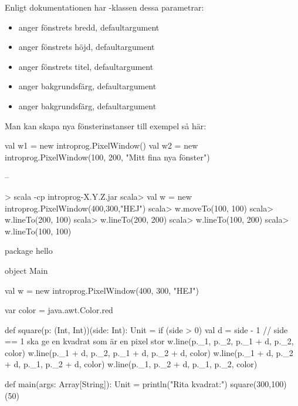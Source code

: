 \SubtaskSolved Enligt dokumentationen har -klassen dessa parametrar:
\begin{itemize}[nolistsep,noitemsep]
  \item {} anger fönstrets bredd, defaultargument 
  \item {} anger fönstrets höjd, defaultargument 
  \item {} anger fönstrets titel, defaultargument 
  \item {} anger bakgrundsfärg, defaultargument 
  \item {} anger bakgrundsfärg, defaultargument 
\end{itemize}
Man kan skapa nya fönsterinstanser till exempel så här:
\begin{Code}
val w1 = new introprog.PixelWindow()
val w2 = new introprog.PixelWindow(100, 200, "Mitt fina nya fönster")
\end{Code}

\SubtaskSolved --

\SubtaskSolved
\begin{REPL}
> scala -cp introprog-X.Y.Z.jar
scala> val w = new introprog.PixelWindow(400,300,"HEJ")
scala> w.moveTo(100, 100)
scala> w.lineTo(200, 100)
scala> w.lineTo(200, 200)
scala> w.lineTo(100, 200)
scala> w.lineTo(100, 100)
\end{REPL}

\SubtaskSolved
\begin{Code}
package hello

object Main {
  val w = new introprog.PixelWindow(400, 300, "HEJ")

  var color = java.awt.Color.red

  def square(p: (Int, Int))(side: Int): Unit = if (side > 0) {
    val d = side - 1  // side == 1 ska ge en kvadrat som är en pixel stor
    w.line(p._1,     p._2,     p._1 + d, p._2,     color)
    w.line(p._1 + d, p._2,     p._1 + d, p._2 + d, color)
    w.line(p._1 + d, p._2 + d, p._1,     p._2 + d, color)
    w.line(p._1,     p._2 + d, p._1,     p._2,     color)
  }

  def main(args: Array[String]): Unit = {
    println("Rita kvadrat:")
    square(300,100)(50)
  }
}

\end{Code}


